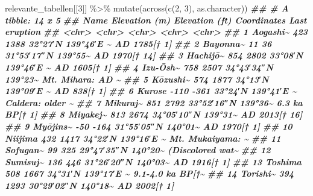 \documentclass[
  ngerman,
]{article}
\newenvironment{Shaded}{\begin{snugshade}}{\end{snugshade}}
\newcommand{\DecValTok}[1]{\textcolor[rgb]{0.00,0.00,0.81}{#1}}
\newcommand{\DocumentationTok}[1]{\textcolor[rgb]{0.56,0.35,0.01}{\textbf{\textit{#1}}}}
\newcommand{\FunctionTok}[1]{\textcolor[rgb]{0.00,0.00,0.00}{#1}}
\newcommand{\NormalTok}[1]{#1}
\newcommand{\SpecialCharTok}[1]{\textcolor[rgb]{0.00,0.00,0.00}{#1}}
\begin{document}
\begin{Shaded}
\begin{Highlighting}[]
\NormalTok{relevante\_tabellen[[}\DecValTok{3}\NormalTok{]] }\SpecialCharTok{\%\textgreater{}\%}
  \FunctionTok{mutate}\NormalTok{(}\FunctionTok{across}\NormalTok{(}\FunctionTok{c}\NormalTok{(}\DecValTok{2}\NormalTok{, }\DecValTok{3}\NormalTok{), as.character))}
\DocumentationTok{\#\# \# A tibble: 14 x 5}
\DocumentationTok{\#\#    Name     \textasciigrave{}Elevation (m)\textasciigrave{} \textasciigrave{}Elevation (ft)\textasciigrave{} Coordinates        \textasciigrave{}Last eruption\textasciigrave{} }
\DocumentationTok{\#\#    \textless{}chr\textgreater{}    \textless{}chr\textgreater{}           \textless{}chr\textgreater{}            \textless{}chr\textgreater{}              \textless{}chr\textgreater{}           }
\DocumentationTok{\#\#  1 Aogashi\textasciitilde{} 423             1388             32°27′N 139°46′E﻿ \textasciitilde{} AD 1785[† 1]    }
\DocumentationTok{\#\#  2 Bayonna\textasciitilde{} 11              36               31°53′17″N 139°55\textasciitilde{} AD 1970[† 14]   }
\DocumentationTok{\#\#  3 Hachijō\textasciitilde{} 854             2802             33°08′N 139°46′E﻿ \textasciitilde{} AD 1605[† 1]    }
\DocumentationTok{\#\#  4 Izu{-}Ōsh\textasciitilde{} 758             2507             34°43′34″N 139°23\textasciitilde{} Mt. Mihara: AD \textasciitilde{}}
\DocumentationTok{\#\#  5 Kōzushi\textasciitilde{} 574             1877             34°13′N 139°09′E﻿ \textasciitilde{} AD 838[† 1]     }
\DocumentationTok{\#\#  6 Kurose   {-}110            {-}361             33°24′N 139°41′E﻿ \textasciitilde{} Caldera: older \textasciitilde{}}
\DocumentationTok{\#\#  7 Mikuraj\textasciitilde{} 851             2792             33°52′16″N 139°36\textasciitilde{} 6.3 ka BP[† 1]  }
\DocumentationTok{\#\#  8 Miyakej\textasciitilde{} 813             2674             34°05′10″N 139°31\textasciitilde{} AD 2013[† 16]   }
\DocumentationTok{\#\#  9 Myōjins\textasciitilde{} {-}50             {-}164             31°55′05″N 140°01\textasciitilde{} AD 1970[† 1]    }
\DocumentationTok{\#\# 10 Niijima  432             1417             34°22′N 139°16′E﻿ \textasciitilde{} Mt. Mukaiyama: \textasciitilde{}}
\DocumentationTok{\#\# 11 Sofugan\textasciitilde{} 99              325              29°47′35″N 140°20\textasciitilde{} (Discolored wat\textasciitilde{}}
\DocumentationTok{\#\# 12 Sumisuj\textasciitilde{} 136             446              31°26′20″N 140°03\textasciitilde{} AD 1916[† 1]    }
\DocumentationTok{\#\# 13 Toshima  508             1667             34°31′N 139°17′E﻿ \textasciitilde{} 9.1{-}4.0 ka BP[†\textasciitilde{}}
\DocumentationTok{\#\# 14 Torishi\textasciitilde{} 394             1293             30°29′02″N 140°18\textasciitilde{} AD 2002[† 1]}
\end{Highlighting}
\end{Shaded}
\end{document}
